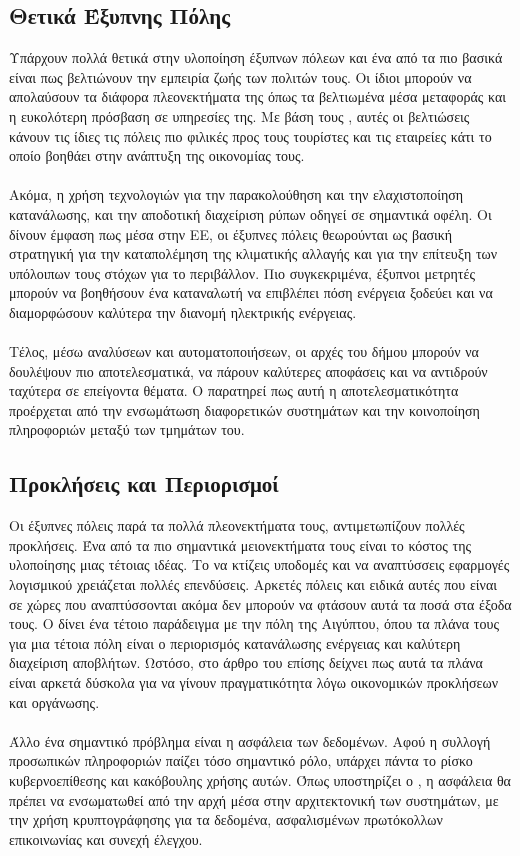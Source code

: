 \subsection{Θετικά Έξυπνης Πόλης}
Υπάρχουν πολλά θετικά στην υλοποίηση έξυπνων πόλεων και ένα από τα πιο βασικά είναι πως βελτιώνουν την εμπειρία ζωής των πολιτών τους. Οι ίδιοι μπορούν να απολαύσουν τα διάφορα πλεονεκτήματα της όπως τα βελτιωμένα μέσα μεταφοράς και η ευκολότερη πρόσβαση σε υπηρεσίες της. Με βάση τους \textcite{arroub2016literature}, αυτές οι βελτιώσεις κάνουν τις ίδιες τις πόλεις πιο φιλικές προς τους τουρίστες και τις εταιρείες κάτι το οποίο βοηθάει στην ανάπτυξη της οικονομίας τους.
\\
\\
Ακόμα, η χρήση τεχνολογιών για την παρακολούθηση και την ελαχιστοποίηση κατανάλωσης, και την αποδοτική διαχείριση ρύπων οδηγεί σε σημαντικά οφέλη. Οι \textcite{drakouli2019} δίνουν έμφαση πως μέσα στην ΕΕ, οι έξυπνες πόλεις θεωρούνται ως βασική στρατηγική για την καταπολέμηση της κλιματικής αλλαγής και για την επίτευξη των υπόλοιπων τους στόχων για το περιβάλλον. Πιο συγκεκριμένα, έξυπνοι μετρητές μπορούν να βοηθήσουν ένα καταναλωτή να επιβλέπει πόση ενέργεια ξοδεύει και να διαμορφώσουν καλύτερα την διανομή ηλεκτρικής ενέργειας.
\\
\\
Τέλος, μέσω αναλύσεων και αυτοματοποιήσεων, οι αρχές του δήμου μπορούν να δουλέψουν πιο αποτελεσματικά, να πάρουν καλύτερες αποφάσεις και να αντιδρούν ταχύτερα σε επείγοντα θέματα. Ο \textcite{anthopoulos2015defining} παρατηρεί πως αυτή η αποτελεσματικότητα προέρχεται από την ενσωμάτωση διαφορετικών συστημάτων και την κοινοποίηση πληροφοριών μεταξύ των τμημάτων του.

\subsection{Προκλήσεις και Περιορισμοί}
Οι έξυπνες πόλεις παρά τα πολλά πλεονεκτήματα τους, αντιμετωπίζουν πολλές προκλήσεις. Ένα από τα πιο σημαντικά μειονεκτήματα τους είναι το κόστος της υλοποίησης μιας τέτοιας ιδέας. Το να κτίζεις υποδομές και να αναπτύσσεις εφαρμογές λογισμικού χρειάζεται πολλές επενδύσεις. Αρκετές πόλεις και ειδικά αυτές που είναι σε χώρες που αναπτύσσονται ακόμα δεν μπορούν να φτάσουν αυτά τα ποσά στα έξοδα τους. Ο \textcite{konbr2019smart} δίνει ένα τέτοιο παράδειγμα με την πόλη της Αιγύπτου, όπου τα πλάνα τους για μια τέτοια πόλη είναι ο περιορισμός κατανάλωσης ενέργειας και καλύτερη διαχείριση αποβλήτων. Ωστόσο, στο άρθρο του επίσης δείχνει πως αυτά τα πλάνα είναι αρκετά δύσκολα για να γίνουν πραγματικότητα λόγω οικονομικών προκλήσεων και οργάνωσης. 
\\
\\
Άλλο ένα σημαντικό πρόβλημα είναι η ασφάλεια των δεδομένων. Αφού η συλλογή προσωπικών πληροφοριών παίζει τόσο σημαντικό ρόλο, υπάρχει πάντα το ρίσκο κυβερνοεπίθεσης και κακόβουλης χρήσης αυτών. Όπως υποστηρίζει ο \textcite{anthopoulos2015defining}, η ασφάλεια θα πρέπει να ενσωματωθεί από την αρχή μέσα στην αρχιτεκτονική των συστημάτων, με την χρήση κρυπτογράφησης για τα δεδομένα, ασφαλισμένων πρωτόκολλων επικοινωνίας και συνεχή έλεγχου.

